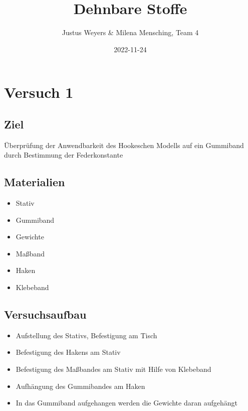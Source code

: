 \documentclass[
  9pt,
]{article}
\title{Dehnbare Stoffe}
\author{Justus Weyers \& Milena Mensching, Team 4}
\date{2022-11-24}
\providecommand{\tightlist}{%
  \setlength{\itemsep}{0pt}\setlength{\parskip}{0pt}}
\begin{document}
\maketitle

\hypertarget{versuch-1}{%
\section{Versuch 1}\label{versuch-1}}

\hypertarget{ziel}{%
\subsection{Ziel}\label{ziel}}

Überprüfung der Anwendbarkeit des Hookeschen Modells auf ein Gummiband
durch Bestimmung der Federkonstante

\hypertarget{materialien}{%
\subsection{Materialien}\label{materialien}}

\begin{itemize}
\tightlist
\item
  Stativ
\item
  Gummiband
\item
  Gewichte
\item
  Maßband
\item
  Haken
\item
  Klebeband
\end{itemize}

\hypertarget{versuchsaufbau}{%
\subsection{Versuchsaufbau}\label{versuchsaufbau}}

\begin{itemize}
\tightlist
\item
  Aufstellung des Stativs, Befestigung am Tisch
\item
  Befestigung des Hakens am Stativ
\item
  Befestigung des Maßbandes am Stativ mit Hilfe von Klebeband
\item
  Aufhängung des Gummibandes am Haken
\item
  In das Gummiband aufgehangen werden die Gewichte daran aufgehängt
\end{itemize}
\end{document}
